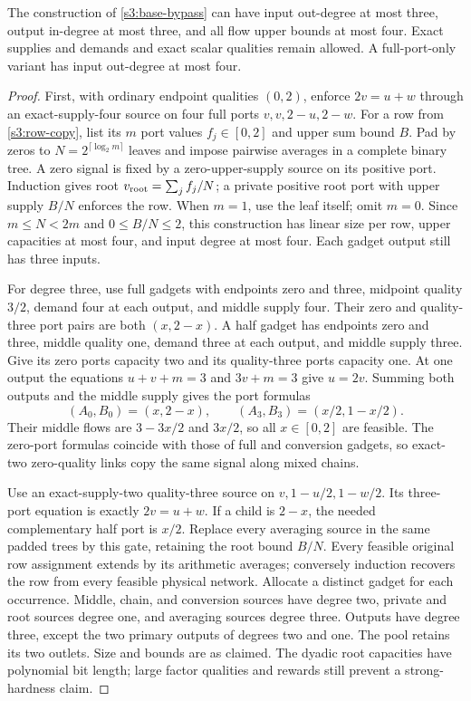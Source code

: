 \begin{lemma}\label{s3:half}
The construction of \cref{s3:base-bypass} can have input out-degree at
most three, output in-degree at most three, and all flow upper bounds at
most four. Exact supplies and demands and exact scalar qualities remain
allowed. A full-port-only variant has input out-degree at most four.
\end{lemma}
\begin{proof}
First, with ordinary endpoint qualities $(0,2)$, enforce
$2v=u+w$ through an exact-supply-four source on four full ports
$v,v,2-u,2-w$. For a row from \cref{s3:row-copy}, list its $m$ port
values $f_j\in[0,2]$ and upper sum bound $B$. Pad by zeros to
$N=2^{\lceil\log_2m\rceil}$ leaves and impose pairwise averages in a
complete binary tree. A zero signal is fixed by a zero-upper-supply
source on its positive port. Induction gives root
$v_{\rm root}=\sum_jf_j/N$; a private positive root port with upper
supply $B/N$ enforces the row. When $m=1$, use the leaf itself; omit
$m=0$. Since $m\le N<2m$ and $0\le B/N\le2$, this construction has
linear size per row, upper capacities at most four, and input degree
at most four. Each gadget output still has three inputs.

For degree three, use full gadgets with endpoints zero and three,
midpoint quality $3/2$, demand four at each output, and middle supply
four. Their zero and quality-three port pairs are both $(x,2-x)$.
A half gadget has endpoints zero and three, middle quality one,
demand three at each output, and middle supply three. Give its zero
ports capacity two and its quality-three ports capacity one. At one
output the equations $u+v+m=3$ and $3v+m=3$ give $u=2v$.
Summing both outputs and the middle supply gives the port formulas
\begin{equation}
 (A_0,B_0)=(x,2-x),\qquad
 (A_3,B_3)=(x/2,1-x/2).\label{s3:half-ports}
\end{equation}
Their middle flows are $3-3x/2$ and $3x/2$, so all $x\in[0,2]$
are feasible. The zero-port formulas coincide with those of full and
conversion gadgets, so exact-two zero-quality links copy the same
signal along mixed chains.

Use an exact-supply-two quality-three source on
$v,1-u/2,1-w/2$. Its three-port equation is exactly $2v=u+w$.
If a child is $2-x$, the needed complementary half port is $x/2$.
Replace every averaging source in the same padded trees by this gate,
retaining the root bound $B/N$. Every feasible original row assignment
extends by its arithmetic averages; conversely induction recovers the
row from every feasible physical network. Allocate a distinct gadget
for each occurrence. Middle, chain, and conversion sources have degree
two, private and root sources degree one, and averaging sources degree
three. Outputs have degree three, except the two primary outputs of
degrees two and one. The pool retains its two outlets. Size and bounds
are as claimed. The dyadic root capacities have polynomial bit length;
large factor qualities and rewards still prevent a strong-hardness claim.
\end{proof}

